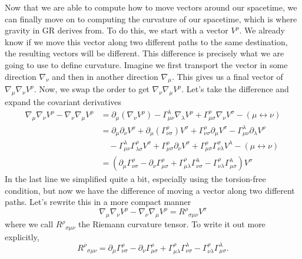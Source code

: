\begin{bibunit}[unsrtnat]
Now that we are able to compute how to move vectors around our spacetime, we can
finally move on to computing the curvature of our spacetime, which is where
gravity in GR derives from. To do this, we start with a vector $V^\rho$. We
already know if we move this vector along two different paths to the same
destination, the resulting vectors will be different. This difference is
precisely what we are going to use to define curvature. Imagine we first
transport the vector in some direction $\nabla_\nu$ and then in another
direction $\nabla_\mu$. This gives us a final vector of $\nabla_\mu\nabla_\nu
V^\rho$. Now, we swap the order to get $\nabla_\nu\nabla_\mu V^\rho$. Let's take
the difference and expand the covariant derivatives
\begin{align}
   \nabla_\mu\nabla_\nu V^\rho - \nabla_\nu\nabla_\mu V^\rho
   &= \partial_\mu(\nabla_\nu V^\rho)
      - \Gamma^\lambda_{\mu\nu}\nabla_\lambda V^\rho
      + \Gamma^\rho_{\mu\sigma}\nabla_\nu V^\sigma
      - (\mu \leftrightarrow \nu) \nonumber\\
   &= \partial_\mu\partial_\nu V^\rho
      + \partial_\mu(\Gamma^\rho_{\nu\sigma})V^\sigma
      + \Gamma^\rho_{\nu\sigma}\partial_\mu V^\sigma
      - \Gamma^\lambda_{\mu\nu}\partial_\lambda V^\rho \nonumber\\
   &\quad  - \Gamma^\lambda_{\mu\nu}\Gamma^\rho_{\lambda\sigma} V^\sigma
      + \Gamma^\rho_{\mu\sigma}\partial_\nu V^\sigma
      + \Gamma^\rho_{\mu\sigma}\Gamma^\sigma_{\nu\lambda} V^\lambda
      - (\mu \leftrightarrow \nu) \nonumber\\
   &= (\partial_\mu\Gamma^\rho_{\nu\sigma} - \partial_\nu\Gamma^\rho_{\mu\sigma}
      + \Gamma^\rho_{\mu\lambda}\Gamma^\lambda_{\nu\sigma}
      - \Gamma^\rho_{\nu\lambda}\Gamma^\lambda_{\mu\sigma}) V^\sigma
\end{align}
In the last line we simplified quite a bit, especially using the torsion-free
condition, but now we have the difference of moving a vector along two different
paths. Let's rewrite this in a more compact manner
\begin{equation}
   \nabla_\mu\nabla_\nu V^\rho - \nabla_\nu\nabla_\mu V^\rho =
   {R^\rho}_{\sigma\mu\nu} V^\sigma
\end{equation}
where we call ${R^\rho}_{\sigma\mu\nu}$ the Riemann curvature tensor. To write
it out more explicitly,
\begin{equation}
   {R^\rho}_{\sigma\mu\nu} =
      \partial_\mu\Gamma^\rho_{\nu\sigma} - \partial_\nu\Gamma^\rho_{\mu\sigma}
      + \Gamma^\rho_{\mu\lambda}\Gamma^\lambda_{\nu\sigma}
      - \Gamma^\rho_{\nu\lambda}\Gamma^\lambda_{\mu\sigma}.
\end{equation}


\end{bibunit}

